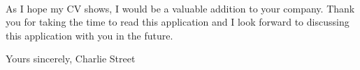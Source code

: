 \documentclass[12pt]{article}
\begin{document}
\begin{flushleft}
		\paragraph{}
			As I hope my CV shows, I would be a valuable addition to your company. Thank you for taking the time to read this application and I look forward to discussing this application with you in the future.\\

		
	\end{flushleft}

	\begin{flushleft}
		Yours sincerely,
		\newline
		\break
		Charlie Street
	\end{flushleft}
\end{document}
